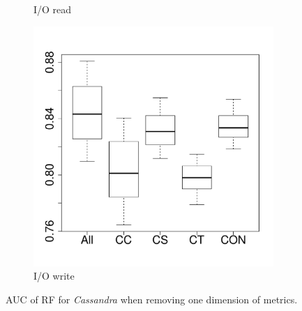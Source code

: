 \documentclass[10pt,journal,compsoc]{IEEEtran}
\begin{document}
\begin{figure}[t]
\begin{subfigure}{0.19\textwidth}
                \caption{I/O read}
        \end{subfigure}
        \begin{subfigure}{0.19\textwidth}
                \includegraphics[width=\linewidth]{Figures/iowrite-cassandraremove-importance.pdf}
                \caption{I/O write}
        \end{subfigure}
        
	\caption{AUC of RF for \emph{Cassandra} when removing one dimension of metrics.} %
	\label{fig:importance-dimenssion-remove-cassandra}
\end{figure}
\end{document}
